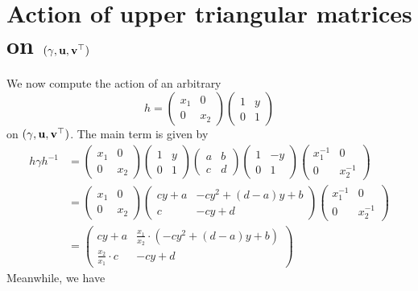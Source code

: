 \section{Action of upper triangular matrices on $(\gamma, \mathbf u, \mathbf v^\top)$}
We now compute the action of an arbitrary
\[ h = \begin{pmatrix} x_1 & 0 \\ 0 & x_2 \end{pmatrix}
  \begin{pmatrix} 1 & y \\ 0 & 1 \end{pmatrix} \]
on $(\gamma, \mathbf u, \mathbf v^\top)$.
The main term is given by
\begin{align*}
  h \gamma h^{-1}
  &=
  \begin{pmatrix} x_1 & 0 \\ 0 & x_2 \end{pmatrix}
  \begin{pmatrix} 1 & y \\ 0 & 1 \end{pmatrix}
  \begin{pmatrix} a & b \\ c & d \end{pmatrix}
  \begin{pmatrix} 1 & -y \\ 0 & 1 \end{pmatrix}
  \begin{pmatrix} x_1^{-1} & 0 \\ 0 & x_2^{-1} \end{pmatrix} \\
  &=
  \begin{pmatrix} x_1 & 0 \\ 0 & x_2 \end{pmatrix}
  \begin{pmatrix} cy + a & -cy^2+(d-a)y+b \\ c & -cy+d \end{pmatrix}
  \begin{pmatrix} x_1^{-1} & 0 \\ 0 & x_2^{-1} \end{pmatrix} \\
  &=
  \begin{pmatrix} cy + a & \frac{x_1}{x_2} \cdot \left( -cy^2+(d-a)y+b \right) \\
    \frac{x_2}{x_1} \cdot c & -cy+d \end{pmatrix}
\end{align*}
Meanwhile, we have
